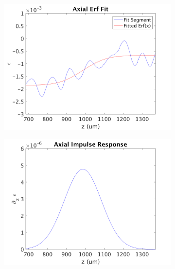 \begin{figure}[t]
	\centering
	\begin{subfigure}{0.49\textwidth}
		\centering
		\includegraphics[width=\textwidth]{figures/axial_erf_fit.png}
	\end{subfigure}
	\begin{subfigure}{0.49\textwidth}
		\centering
		\includegraphics[width=\textwidth]{figures/axial_impulse_response.png}
	\end{subfigure}
	\\
	\begin{subfigure}{0.49\textwidth}
		\centering

\end{subfigure}
\end{figure}
